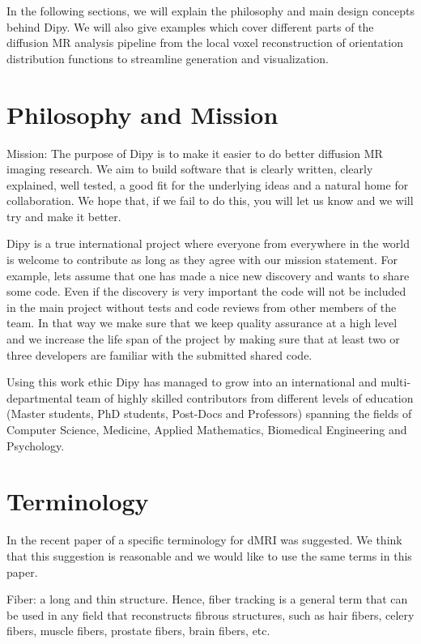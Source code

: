 \documentclass{bioinfo}
\begin{document}
In the following sections, we will explain the philosophy and main design concepts behind Dipy. We will also give examples which cover different parts of the diffusion MR analysis pipeline from the local voxel reconstruction of orientation distribution functions to streamline generation and visualization. 

\section{Philosophy and Mission}

Mission: The purpose of Dipy is to make it easier to do better diffusion MR imaging research. We aim to build software that is clearly written, clearly explained, well tested, a good fit for the underlying ideas and a natural home for collaboration. We hope that, if we fail to do this, you will let us know and we will try and make it 
better.

Dipy is a true international project where everyone from everywhere in the world is welcome to contribute as long as they agree with our mission statement. For example, lets assume that one has made a nice new discovery and wants to share some code. Even if the discovery is very important the code will not be included in the main project without tests and code reviews from other members of the team. In that way we make sure that we keep quality assurance at a high level and we increase the life span of the project by making sure that at least two or three developers are familiar with the submitted shared code.

Using this work ethic Dipy has managed to grow into an international and multi-departmental team of highly skilled contributors from different levels of education (Master students, PhD students, Post-Docs and Professors) spanning the fields of Computer Science, Medicine, Applied Mathematics, Biomedical Engineering and Psychology. 


\section{Terminology}

In the recent paper of \citep{Cote2013tractometer} a specific terminology for dMRI was suggested. We think that this suggestion is reasonable and we would like to use the same terms in this paper. 

Fiber: a long and thin structure. Hence, fiber tracking is a general term that can be
used in any field that reconstructs fibrous structures, such as hair fibers, celery fibers, muscle fibers,
prostate fibers, brain fibers, etc.
\end{document}
